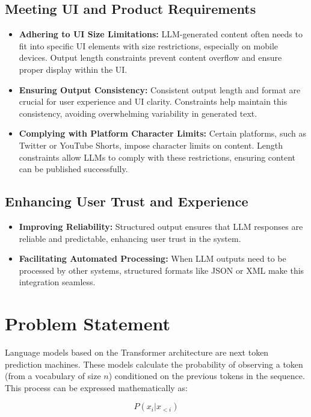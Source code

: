 \documentclass{article}
\begin{document}
\subsection{Meeting UI and Product Requirements}
\begin{itemize}
    \item \textbf{Adhering to UI Size Limitations:} LLM-generated content often needs to fit into specific UI elements with size restrictions, especially on mobile devices. Output length constraints prevent content overflow and ensure proper display within the UI.
    \item \textbf{Ensuring Output Consistency:} Consistent output length and format are crucial for user experience and UI clarity. Constraints help maintain this consistency, avoiding overwhelming variability in generated text.
    \item \textbf{Complying with Platform Character Limits:} Certain platforms, such as Twitter or YouTube Shorts, impose character limits on content. Length constraints allow LLMs to comply with these restrictions, ensuring content can be published successfully.
\end{itemize}

\subsection{Enhancing User Trust and Experience}
\begin{itemize}
    \item \textbf{Improving Reliability:} Structured output ensures that LLM responses are reliable and predictable, enhancing user trust in the system.
    \item \textbf{Facilitating Automated Processing:} When LLM outputs need to be processed by other systems, structured formats like JSON or XML make this integration seamless.
\end{itemize}

\section{Problem Statement}

Language models based on the Transformer architecture are next token prediction machines. These models calculate the probability of observing a token (from a vocabulary of size $n$) conditioned on the previous tokens in the sequence. This process can be expressed mathematically as:

$$P(x_i | x_{<i})$$
\end{document}

